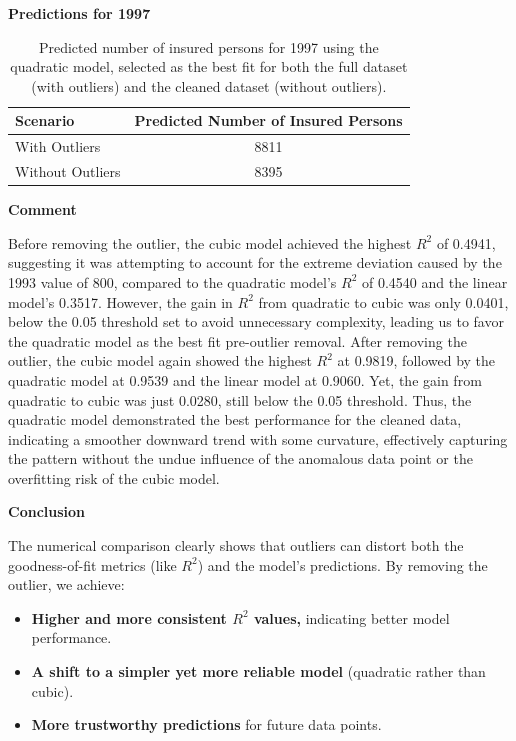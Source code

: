 \documentclass[12pt]{article}
\begin{document}
\textbf{Predictions for 1997}

\begin{table}[h!]
    \centering
    \begin{tabular}{lc}
        \toprule
        \textbf{Scenario} & \textbf{Predicted Number of Insured Persons} \\
        \midrule
        With Outliers & 8811 \\
        Without Outliers & 8395 \\
        \bottomrule
    \end{tabular}
    \caption{Predicted number of insured persons for 1997 using the quadratic model, selected as the best fit for both the full dataset (with outliers) and the cleaned dataset (without outliers).}
    \label{tab:predictions_1997}
\end{table}
\begin{adjustwidth}{0cm}{0cm}
\textbf{Comment}
\end{adjustwidth}
Before removing the outlier, the cubic model achieved the highest \( R^2 \) of 0.4941, suggesting it was attempting to account for the extreme deviation caused by the 1993 value of 800, compared to the quadratic model’s \( R^2 \) of 0.4540 and the linear model’s 0.3517. However, the gain in \( R^2 \) from quadratic to cubic was only 0.0401, below the 0.05 threshold set to avoid unnecessary complexity, leading us to favor the quadratic model as the best fit pre-outlier removal. After removing the outlier, the cubic model again showed the highest \( R^2 \) at 0.9819, followed by the quadratic model at 0.9539 and the linear model at 0.9060. Yet, the gain from quadratic to cubic was just 0.0280, still below the 0.05 threshold. Thus, the quadratic model demonstrated the best performance for the cleaned data, indicating a smoother downward trend with some curvature, effectively capturing the pattern without the undue influence of the anomalous data point or the overfitting risk of the cubic model.\\
\begin{adjustwidth}{0cm}{0cm}
\textbf{Conclusion}
\end{adjustwidth}
The numerical comparison clearly shows that outliers can distort both the goodness-of-fit metrics (like \( R^2 \)) and the model’s predictions. By removing the outlier, we achieve:

\begin{itemize}
    \item \textbf{Higher and more consistent \( R^2 \) values,} indicating better model performance.
    \item \textbf{A shift to a simpler yet more reliable model} (quadratic rather than cubic).
    \item \textbf{More trustworthy predictions} for future data points. \\
\end{itemize}
\end{document}
